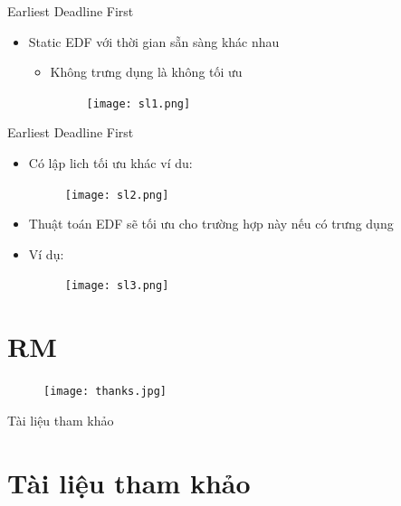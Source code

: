 \documentclass{beamer}
\newcommand{\bi}{\begin{itemize}}
\newcommand{\ei}{\end{itemize}}
\begin{document}
\begin{frame}{Earliest Deadline First}
\begin{itemize}
\item Static EDF với thời gian sẵn sàng khác nhau
\bi
\item Không trưng dụng là không tối ưu
\begin{figure}[h]
\begin{center}
\texttt{[image: sl1.png]}
\end{center}
\end{figure}
\ei
\end{itemize}
\end{frame}
\begin{frame}{Earliest Deadline First}
\begin{itemize}
\item Có lập lich tối ưu khác ví du:
\begin{figure}[h]
\begin{center}
\texttt{[image: sl2.png]}
\end{center}
\end{figure}
\item Thuật toán EDF sẽ tối ưu cho trường hợp này nếu có trưng dụng
\item Ví dụ:
\begin{figure}[h]
\begin{center}
\texttt{[image: sl3.png]}
\end{center}
\end{figure}
\end{itemize}
\end{frame}
\section{RM}
\begin{frame}
\begin{figure}[h]
\begin{center}
\texttt{[image: thanks.jpg]}
\end{center}
\end{figure}
\end{frame}
\begin{frame}{Tài liệu tham khảo}
\section*{Tài liệu tham khảo}
\end{frame}
\end{document}
